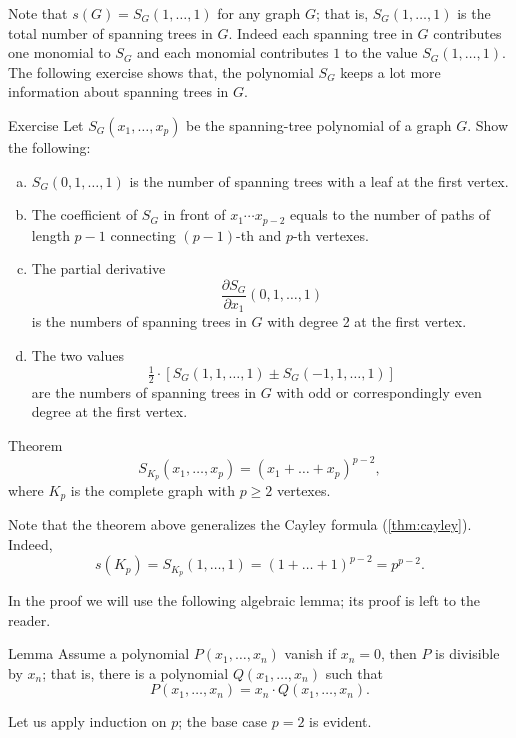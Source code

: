 Note that $s(G)=S_G(1,\dots,1)$ for any graph $G$; that is, $S_G(1,\dots,1)$ is the total number of spanning trees in $G$.
Indeed each spanning tree in $G$ contributes one monomial to $S_G$ and each monomial contributes $1$ to the value $S_G(1,\dots,1)$.
The following exercise shows that,
the polynomial $S_G$ keeps a lot more information about spanning trees in $G$.   

\begin{thm}{Exercise}
Let $S_G(x_1,\dots,x_p)$ be the spanning-tree polynomial of a graph $G$.
Show the following:
\begin{enumerate}[(a)]
\item $S_G(0,1,\dots,1)$ is the number of spanning trees with a leaf at the first vertex.
\item The coefficient of $S_G$ in front of $x_1\cdots x_{p-2}$ equals to the number of paths of length $p-1$ connecting $(p-1)$-th and $p$-th vertexes.
\item The partial derivative
\[\frac{\partial S_G}{\partial x_1}(0,1,\dots,1)\]
is the numbers of spanning trees in $G$ with degree 2 at the first vertex.
\item The two values 
\[\tfrac12\cdot\left[S_G(1,1,\dots,1)\pm S_G(-1,1,\dots,1)\right]\]
are the numbers of spanning trees in $G$ with odd or correspondingly even degree at the first vertex.
\end{enumerate}
\end{thm}

\begin{thm}{Theorem}\label{thm:spanning-tree-polynomial}
\[S_{K_p}(x_1,\dots,x_p)=(x_1+\dots +x_p)^{p-2},\]
where $K_p$ is the complete graph with $p\ge 2$ vertexes.
\end{thm}

Note that the theorem above generalizes the Cayley formula (\ref{thm:cayley}).
Indeed, 
\[s(K_p)=S_{K_p}(1,\dots,1)=
(1+\dots+1)^{p-2}=p^{p-2}.\]

In the proof we will use the following algebraic lemma; its proof is left to the reader.


\begin{thm}{Lemma}\label{lem:polyx} Assume a polynomial $P(x_1,\dots,x_n)$ vanish if $x_n=0$, then $P$ is divisible by $x_n$;
that is, there is a polynomial $Q(x_1,\dots,x_n)$ such that
\[P(x_1,\dots,x_n)=x_n\cdot Q(x_1,\dots,x_n).\]
\end{thm}


Let us apply induction on $p$;
the base case $p=2$ is evident.

